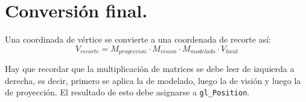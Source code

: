 \section{Conversión final.}
Una coordinada de vértice se convierte a una coordenada de recorte así:
\begin{equation*}
    V_{recorte} = M_{proyeccion} \cdot M_{vision} \cdot M_{modelado} \cdot V_{local}
\end{equation*}

Hay que recordar que la multiplicación de matrices se debe leer de izquierda a derecha, es decir, primero se aplica la de modelado, luego la de visión y luego la de proyección. El resultado de esto debe asignarse a \lstinline{gl_Position}.